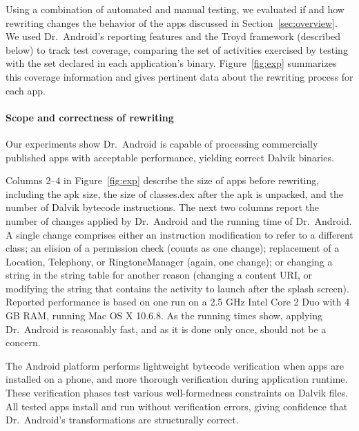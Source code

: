 \documentclass[preprint]{sig-alternate-10pt}
\newcommand{\code}[1]{\textsf{#1}}
\newcommand{\rewriter}{Dr.\ Android\xspace}
\newcommand{\troyd}{Troyd\xspace}
\begin{document}
Using a combination of automated and manual testing, we evaluated
if and how rewriting changes the behavior of the apps discussed in Section~\ref{sec:overview}.  We used \rewriter's
reporting features and the \troyd framework (described below) to track test
coverage, comparing the set of activities exercised by testing with the set
declared in each application's binary. 
Figure~\ref{fig:exp} summarizes this coverage information
and gives pertinent data about the rewriting process 
for each app.


\paragraph*{Scope and correctness of rewriting}

Our experiments show \rewriter is capable of processing commercially published
apps with acceptable performance, yielding correct Dalvik binaries.

Columns 2--4 in Figure~\ref{fig:exp} describe the size of apps before rewriting,
including the apk size, the size of
\code{classes.dex} after the apk is unpacked, and the number of
Dalvik bytecode instructions. %
The next two columns report the number of changes applied by
\rewriter and the running time of \rewriter. A single change comprises
either an instruction modification to refer to a different class; an
elision of a permission check (counts as one change); replacement of a
\code{Location}, \code{Telephony}, or \code{RingtoneManager} (again,
one change); or changing a string in the string table for another
reason (changing a content URI, or modifying the string that contains
the activity to launch after the splash screen).  Reported performance
is based on one run on a 2.5 GHz Intel Core 2 Duo with 4 GB RAM, running
Mac OS X 10.6.8.
As the running times show, applying \rewriter is
reasonably fast, and as it is done only once, should not be a concern.

The Android platform performs lightweight bytecode verification when apps are
installed on a phone, and more thorough verification during application
runtime.  These verification phases test various well-formedness constraints on Dalvik files.
All tested apps install and run without verification errors, giving
confidence that \rewriter's transformations are structurally correct.
\end{document}
